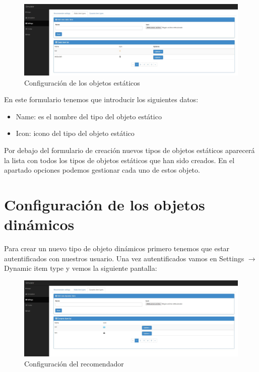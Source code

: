 \begin{figure}[H]
	\centering\includegraphics[scale=0.3]{imagenes/capitulo3/config-objetos-estaticos.jpg}
	\caption{Configuración de los objetos estáticos}
	\label{img:ConfiguracionObjetosEstaticos}
\end{figure}

\newpage

En este formulario tenemos que introducir los siguientes datos:

\begin{itemize}
	\item Name: es el nombre del tipo del objeto estático
	\item Icon: icono del tipo del objeto estático
\end{itemize}	

Por debajo del formulario de creación nuevos tipos de objetos estáticos aparecerá la lista con todos los tipos de objetos estáticos que han sido creados. En el apartado opciones podemos gestionar cada uno de estos objeto.

\section{Configuración de los objetos dinámicos}\label{sec:confObjDinamicos}

Para crear un nuevo tipo de objeto dinámicos primero tenemos que estar autentificados con nuestros usuario. Una vez autentificados vamos en Settings $\rightarrow$ Dynamic item type y vemos la siguiente pantalla:

\begin{figure}[H]
	\centering\includegraphics[scale=0.3]{imagenes/capitulo4/config-objetos-dinamicos.jpg}
	\caption{Configuración del recomendador}
	\label{img:ConfiguracionObjetosDinamicos}
\end{figure}

